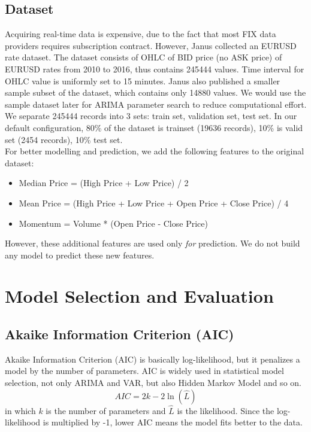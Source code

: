 \documentclass[11pt]{article}
\begin{document}
\subsection{Dataset}
Acquiring real-time data is expensive, due to the fact that most FIX data
providers requires subscription contract. However, Janus \cite{meehau16eurusd}
collected an EURUSD rate dataset. The dataset consists of OHLC of BID price (no
ASK price) of EURUSD rates from 2010 to 2016, thus contains 245444 values. Time
interval for OHLC value is uniformly set to 15 minutes. Janus also published a
smaller sample subset of the dataset, which contains only 14880 values. We would
use the sample dataset later for ARIMA parameter search to reduce computational
effort.\\
We separate 245444 records into 3 sets: train set, validation set, test set. In
our default configuration, 80\% of the dataset is trainset (19636 records), 10\%
is valid set (2454 records), 10\% test set.\\
For better modelling and prediction, we add the following features to the
original dataset:
\begin{itemize}
\item Median Price = (High Price + Low Price) / 2
\item Mean Price = (High Price + Low Price + Open Price + Close Price) / 4
\item Momentum = Volume * (Open Price - Close Price)
\end{itemize}
However, these additional features are used only \textit{for} prediction. We do
not build any model to predict these new features.


\section{Model Selection and Evaluation}
\subsection{Akaike Information Criterion (AIC)}
Akaike Information Criterion (AIC) is basically log-likelihood, but it penalizes
a model by the number of parameters. AIC is widely used in statistical model
selection, not only ARIMA and VAR, but also Hidden Markov Model and so on.
$$
AIC = 2k -2\ln(\hat{L})
$$
in which $k$ is the number of parameters and $\hat{L}$ is the likelihood. Since
the log-likelihood is multiplied by -1, lower AIC means the model fits better to
the data.
\end{document}
